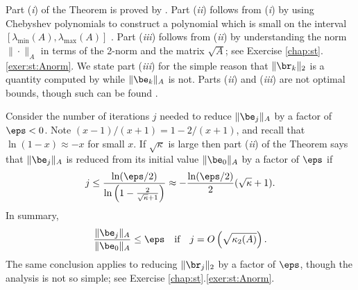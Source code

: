 Part (\emph{i}) of the Theorem is proved by \citet[p.~50]{Greenbaum1997}.  Part (\emph{ii}) follows from (\emph{i}) by using Chebyshev polynomials to construct a polynomial which is small on the interval $[\lambda_{\min}(A),\lambda_{\max}(A)]$ \citep[p.~51]{Greenbaum1997}.  Part (\emph{iii}) follows from (\emph{ii}) by understanding the norm $\|\cdot\|_A$ in terms of the 2-norm and the matrix $\sqrt{A}$; see Exercise \ref{chap:st}.\ref{exer:st:Anorm}.  We state part (\emph{iii}) for the simple reason that $\|\br_k\|_2$ is a quantity computed by \PETSc while $\|\be_k\|_A$ is not.  Parts (\emph{ii}) and (\emph{iii}) are not optimal bounds, though such can be found \citep[p.~51]{Greenbaum1997}.

Consider the number of iterations $j$ needed to reduce $\|\be_j\|_A$ by a factor of $\eps<0$.  Note $(x-1)/(x+1) = 1 - 2/(x+1)$, and recall that $\ln(1-x) \approx -x$ for small $x$.  If $\sqrt{\kappa}$ is large then part (\emph{ii}) of the Theorem says that $\|\be_j\|_A$ is reduced from its initial value $\|\be_0\|_A$ by a factor of $\eps$ if
    $$j \le \frac{\ln(\eps/2)}{\ln\left(1 - \frac{2}{\sqrt{\kappa}+1}\right)} \approx -\frac{\ln(\eps/2)}{2} (\sqrt{\kappa}+1).$$
In summary,
\begin{equation}
\frac{\|\be_j\|_A}{\|\be_0\|_A} \le \eps \quad \text{if} \quad j = O\left(\sqrt{\kappa_2(A)}\right).  \label{cgkappaiter}
\end{equation}
The same conclusion applies to reducing $\|\br_j\|_2$ by a factor of $\eps$, though the analysis is not so simple; see Exercise \ref{chap:st}.\ref{exer:st:Anorm}.

